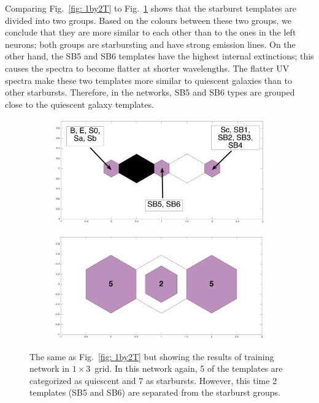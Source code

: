             Comparing Fig.~\ref{fig: 1by2T} to Fig.~\ref{fig: 1by3T} shows that the starburst templates are divided into two groups. 
            Based on the colours between these two groups, we conclude that they are more similar to each other than to the ones in the left neurons; both groups are starbursting and have strong emission lines.
            On the other hand, the SB5 and SB6 templates have the highest internal extinctions; this causes the spectra to become flatter at shorter wavelengths. 
            The flatter UV spectra make these two templates more similar to quiescent galaxies than to other starbursts.
            Therefore, in the networks, SB5 and SB6 types are grouped close to the quiescent galaxy templates.
                
            \begin{figure}
                \begin{subfigure}[b]{0.45\textwidth}
                    \centering
                    \includegraphics[width=\textwidth]{images0.01/1d/dist_1_by_3.png}
                \end{subfigure}
                \hfill
                \begin{subfigure}[b]{0.45\textwidth}
                     \includegraphics[width=\textwidth]{images0.01/1d/hit_t_1_by_3.png}
                \end{subfigure}
                \caption[Results of training network in $1\times3$~grid]{The same as Fig.~\ref{fig: 1by2T} but showing the results of training network in $1\times3$~grid. In this network again, 5 of the \citet{Kinney96} templates are categorized as quiescent and 7 as starbursts. However, this time 2 templates (SB5 and SB6) are separated from the starburst groups.}
                 \label{fig: 1by3T}
            \end{figure}
           
